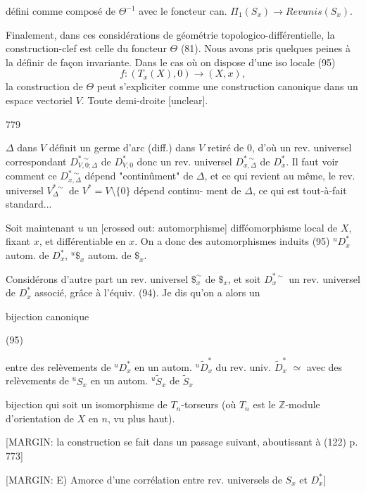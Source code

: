 défini comme composé de $\Theta^{-1}$ avec
le foncteur can. $\Pi_1(S_x) \to Revunis(S_x)$.

Finalement, dans ces considérations
de géométrie topologico-différentielle, la
construction-clef est celle du foncteur
$\Theta$ (81). Nous avons pris quelques peines
à la définir de façon invariante. Dans
le cas où on dispose d'une iso locale
(95) $$f \colon (T_x(X),0) \to (X,x),$$ la
construction de $\Theta$ peut s'expliciter comme
une construction canonique dans un
espace vectoriel $V$. Toute demi-droite [unclear].

\newpage


779

$\Delta$ dans $V$ définit un germe d'arc (diff.)
dans $V$ retiré de $0$, d'où un rev.
universel correspondant $D_{V,0;\Delta}^{* \sim}$ de $D_{V,0}^*$
donc un rev. universel $D_{x,\Delta}^{* \sim}$ de $D_x^*$.
Il faut voir comment ce $D_{x,\Delta}^{* \sim}$ dépend
"continûment" de $\Delta$, et ce qui
revient au même, le rev. universel
$V^{* \sim}_\Delta$ de $V^* = V \setminus \{0\}$ dépend continu-
ment de $\Delta$, ce qui est tout-à-fait
standard...

Soit maintenant $u$ un
[crossed out: automorphisme] difféomorphisme local de $X$, fixant $x$,
et différentiable en $x$. On a donc
des automorphismes induits
(95) $^u D_x^*$ autom. de $D_x^*$, $^u \$_{x}$ autom. de $\$_x$.

Considérons d'autre part un rev. universel
$\$_x^\sim$ de $\$_x$, et soit $D_x^{* \sim}$ un rev.
universel de $D_x^*$ associé, grâce à l'équiv.
(94). Je dis qu'on a alors un

\newpage


bijection canonique

(95)

entre des relèvements de $^u\!D_x^*$ en un autom. $^u\!\tilde{D}_x^*$ du rev. univ. $\tilde{D}_x^*$
$\simeq$
avec des relèvements de $^u\!S_x$ en un autom. $^u\!\tilde{S}_x$ de $\tilde{S}_x$

bijection qui soit un isomorphisme de $T_n$-torseurs (où $T_n$ est le $\mathbb{Z}$-module d'orientation de $X$ en $n$, vu plus haut).

[MARGIN: la construction se fait dans un passage suivant, aboutissant à (122) p. 773]

[MARGIN: E) Amorce d'une corrélation entre rev. universels de $S_x$ et $D_x^*$]

